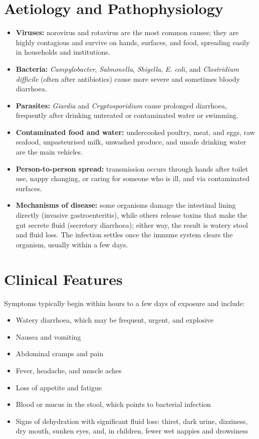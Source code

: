 \section*{Aetiology and Pathophysiology}
\begin{itemize}
    \item \textbf{Viruses:} norovirus and rotavirus are the most common causes; they are highly contagious and survive on hands, surfaces, and food, spreading easily in households and institutions.
    \item \textbf{Bacteria:} \textit{Campylobacter}, \textit{Salmonella}, \textit{Shigella}, \textit{E. coli}, and \textit{Clostridium difficile} (often after antibiotics) cause more severe and sometimes bloody diarrhoea.
    \item \textbf{Parasites:} \textit{Giardia} and \textit{Cryptosporidium} cause prolonged diarrhoea, frequently after drinking untreated or contaminated water or swimming.
    \item \textbf{Contaminated food and water:} undercooked poultry, meat, and eggs, raw seafood, unpasteurised milk, unwashed produce, and unsafe drinking water are the main vehicles.
    \item \textbf{Person-to-person spread:} transmission occurs through hands after toilet use, nappy changing, or caring for someone who is ill, and via contaminated surfaces.
    \item \textbf{Mechanisms of disease:} some organisms damage the intestinal lining directly (invasive gastroenteritis), while others release toxins that make the gut secrete fluid (secretory diarrhoea); either way, the result is watery stool and fluid loss. The infection settles once the immune system clears the organism, usually within a few days.
\end{itemize}

\section*{Clinical Features}
Symptoms typically begin within hours to a few days of exposure and include:
\begin{itemize}
    \item Watery diarrhoea, which may be frequent, urgent, and explosive
    \item Nausea and vomiting
    \item Abdominal cramps and pain
    \item Fever, headache, and muscle aches
    \item Loss of appetite and fatigue
    \item Blood or mucus in the stool, which points to bacterial infection
    \item Signs of dehydration with significant fluid loss: thirst, dark urine, dizziness, dry mouth, sunken eyes, and, in children, fewer wet nappies and drowsiness
\end{itemize}

